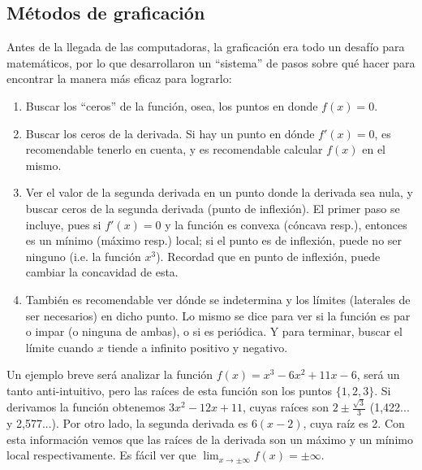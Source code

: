 \documentclass[11pt,oneside,a4paper]{book}
\begin{document}
\subsection*{Métodos de graficación}
Antes de la llegada de las computadoras, la graficación era todo un desafío para matemáticos, por lo que desarrollaron un ``sistema'' de pasos sobre qué hacer para encontrar la manera más eficaz para lograrlo:
\begin{enumerate}[1.]
\item Buscar los ``ceros'' de la función, osea, los puntos en donde $f(x)=0$.
\item Buscar los ceros de la derivada. Si hay un punto en dónde $f'(x)=0$, es recomendable tenerlo en cuenta, y es recomendable calcular $f(x)$ en el mismo.
\item Ver el valor de la segunda derivada en un punto donde la derivada sea nula, y buscar ceros de la segunda derivada (punto de inflexión). El primer paso se incluye, pues si $f'(x)=0$ y la función es convexa (cóncava resp.), entonces es un mínimo (máximo resp.) local; si el punto es de inflexión, puede no ser ninguno (i.e. la función $x^3$). Recordad que en punto de inflexión, puede cambiar la concavidad de esta.
\item También es recomendable ver dónde se indetermina y los límites (laterales de ser necesarios) en dicho punto. Lo mismo se dice para ver si la función es par o impar (o ninguna de ambas), o si es periódica. Y para terminar, buscar el límite cuando $x$ tiende a infinito positivo y negativo.
\end{enumerate}
Un ejemplo breve será analizar la función $f(x)=x^3-6x^2+11x-6$, será un tanto anti-intuitivo, pero las raíces de esta función son los puntos $\{1,2,3\}$. Si derivamos la función obtenemos $3x^2-12x+11$, cuyas raíces son $2\pm\frac{\sqrt{3}}{3}$ (1,422... y 2,577...). Por otro lado, la segunda derivada es $6(x-2)$, cuya raíz es 2. Con esta información vemos que las raíces de la derivada son un máximo y un mínimo local respectivamente. Es fácil ver que $\lim_{x\to\pm\infty}f(x)=\pm\infty$.
\begin{figure}
\centering
{}
\caption{}
\end{figure}
\end{document}

